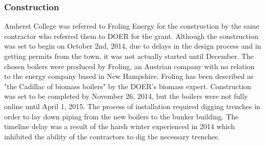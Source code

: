 \subsubsection{Construction}
\par Amherst College was referred to Froling Energy for the construction by the same contractor who referred them to DOER for the grant. Although the construction was set to begin on October 2nd, 2014, due to delays in the design process and in getting permits from the town, it was not actually started until December. The chosen boilers were produced by Froling, an Austrian company with no relation to the energy company based in New Hampshire. Froling has been described as "the Cadillac of biomass boilers" by the DOER's biomass expert. Construction was set to be completed by November 26, 2014, but the boilers were not fully online until April 1, 2015. The process of installation required digging trenches in order to lay down piping from the new boilers to the bunker building. The timeline delay was a result of the harsh winter experienced in 2014 which inhibited the ability of the contractors to dig the necessary trenches.

